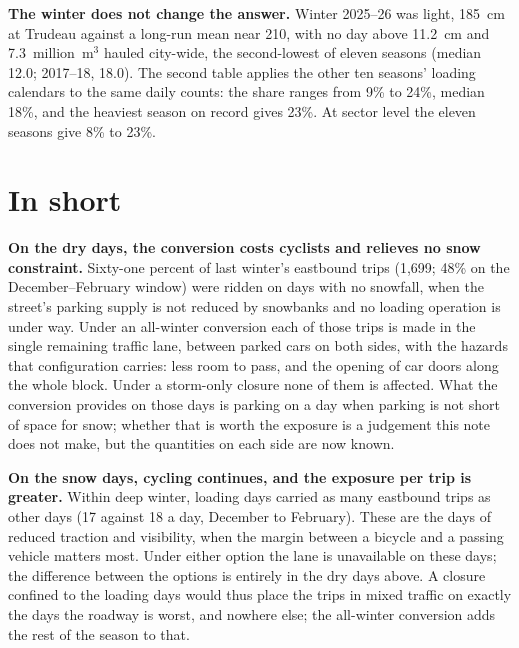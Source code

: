 \documentclass[11pt,letterpaper]{article}
\begin{document}
\textbf{The winter does not change the answer.} Winter 2025--26 was light,
185~cm at Trudeau against a long-run mean near 210, with no day above
11.2~cm and 7.3~million~m$^3$ hauled city-wide, the second-lowest of
eleven seasons (median 12.0; 2017--18, 18.0). The second table applies the
other ten seasons' loading calendars to the same daily counts: the share
ranges from 9\% to 24\%, median 18\%, and the heaviest season on record
gives 23\%. At sector level the eleven seasons give 8\% to 23\%.

\section{In short}

\textbf{On the dry days, the conversion costs cyclists and relieves no
snow constraint.} Sixty-one percent of last winter's eastbound trips
(1{,}699; 48\% on the December--February window) were ridden on days with
no snowfall, when the street's parking supply is not reduced by snowbanks
and no loading operation is under way. Under an all-winter conversion each
of those trips is made in the single remaining traffic lane, between
parked cars on both sides, with the hazards that configuration carries:
less room to pass, and the opening of car doors along the whole block.
Under a storm-only closure none of them is affected. What the conversion
provides on those days is parking on a day when parking is not short of
space for snow; whether that is worth the exposure is a judgement this
note does not make, but the quantities on each side are now known.

\textbf{On the snow days, cycling continues, and the exposure per trip is
greater.} Within deep winter, loading days carried as many eastbound trips
as other days (17 against 18 a day, December to February). These are the
days of reduced traction and visibility, when the margin between a bicycle
and a passing vehicle matters most. Under either option the lane is
unavailable on these days; the difference between the options is entirely
in the dry days above. A closure confined to the loading days would thus
place the trips in mixed traffic on exactly the days the roadway is worst,
and nowhere else; the all-winter conversion adds the rest of the season to
that.
\end{document}
